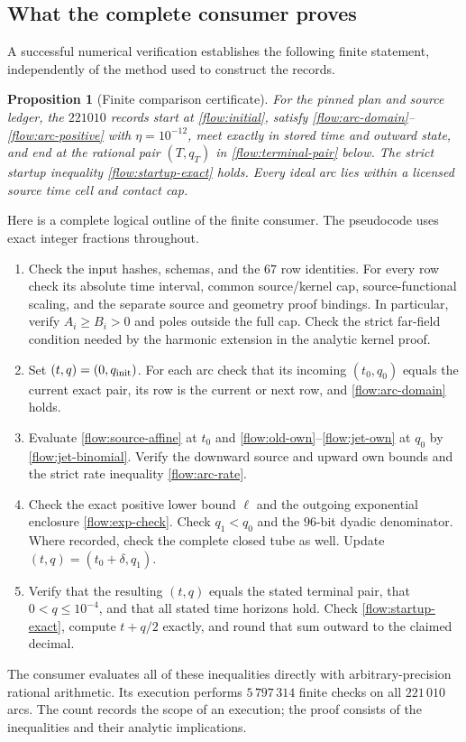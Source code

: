 \documentclass[11pt,a4paper]{article}
\newtheorem{proposition}[theorem]{Proposition}
\theoremstyle{definition}
\theoremstyle{remark}
\begin{document}
\subsection{What the complete consumer proves}
\label{flow:consumer}

A successful numerical verification establishes the following finite
statement, independently of the method used to construct the records.

\begin{proposition}[Finite comparison certificate]
\label{flow:certificate-proposition}
For the pinned plan and source ledger, the $221010$ records start at
\eqref{flow:initial}, satisfy
\eqref{flow:arc-domain}--\eqref{flow:arc-positive} with
$\eta=10^{-12}$, meet exactly in stored time and outward state, and end
at the rational pair $(T,q_T)$ in
\eqref{flow:terminal-pair} below.  The strict startup inequality
\eqref{flow:startup-exact} holds.  Every ideal arc lies within a licensed
source time cell and contact cap.
\end{proposition}

Here is a complete logical outline of the finite consumer.  The
pseudocode uses exact integer fractions throughout.
\begin{enumerate}
\item Check the input hashes, schemas, and the $67$ row identities.
For every row check its absolute time interval, common source/kernel cap,
source-functional scaling, and the separate source and geometry proof
bindings.  In particular, verify $A_i\geq B_i>0$ and poles outside the
full cap.  Check the strict far-field condition needed by the harmonic
extension in the analytic kernel proof.
\item Set $(t,q)=(0,q_{\rm init})$.  For each arc check that its incoming
$(t_0,q_0)$ equals the current exact pair, its row is the current or next
row, and \eqref{flow:arc-domain} holds.
\item Evaluate \eqref{flow:source-affine} at $t_0$ and
\eqref{flow:old-own}--\eqref{flow:jet-own} at $q_0$ by
\eqref{flow:jet-binomial}.  Verify the downward source and upward own
bounds and the strict rate inequality \eqref{flow:arc-rate}.
\item Check the exact positive lower bound $\ell$ and the outgoing
exponential enclosure \eqref{flow:exp-check}.  Check $q_1<q_0$ and the
$96$-bit dyadic denominator.  Where recorded, check the complete closed
tube as well.  Update $(t,q)=(t_0+\delta,q_1)$.
\item Verify that the resulting $(t,q)$ equals the stated terminal pair,
that $0<q\leq10^{-4}$, and that all stated time horizons hold.  Check
\eqref{flow:startup-exact}, compute $t+q/2$ exactly, and round that sum
outward to the claimed decimal.
\end{enumerate}
The consumer  evaluates
all of these inequalities directly with arbitrary-precision rational
arithmetic. Its execution performs $5\,797\,314$ finite checks on all
$221\,010$ arcs. The count records the scope of an execution; the proof
consists of the inequalities and their analytic implications.
\end{document}

